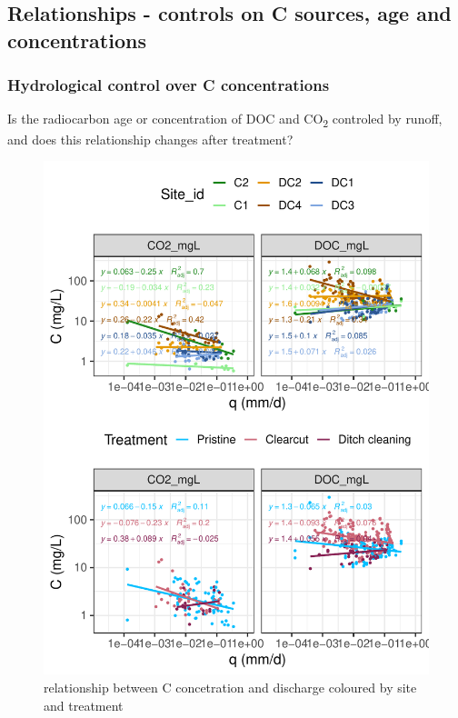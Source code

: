 \documentclass[
]{article}
\begin{document}
\subsection{Relationships - controls on C sources, age and
concentrations}\label{relationships---controls-on-c-sources-age-and-concentrations}

\subsubsection{Hydrological control over C
concentrations}\label{hydrological-control-over-c-concentrations}

Is the radiocarbon age or concentration of DOC and CO\textsubscript{2}
controled by runoff, and does this relationship changes after treatment?

\begin{figure}[H]

{\centering \includegraphics{index_files/figure-pdf/unnamed-chunk-9-1.pdf}

}

\caption{relationship between C concetration and discharge coloured by
site and treatment}

\end{figure}%
\end{document}
